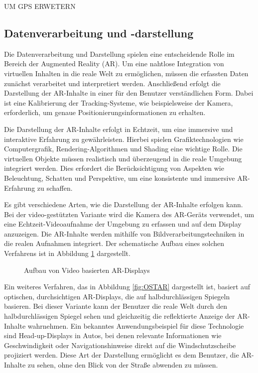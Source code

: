 UM GPS ERWETERN

\subsection{Datenverarbeitung und -darstellung}

Die Datenverarbeitung und Darstellung spielen eine entscheidende Rolle im
Bereich der Augmented Reality (AR). Um eine nahtlose Integration von virtuellen
Inhalten in die reale Welt zu ermöglichen, müssen die erfassten Daten zunächst
verarbeitet und interpretiert werden. Anschließend erfolgt die Darstellung der
AR-Inhalte in einer für den Benutzer verständlichen Form. Dabei ist eine
Kalibrierung der Tracking-Systeme, wie beispielsweise der Kamera, erforderlich,
um genaue Positionierungsinformationen zu erhalten.

Die Darstellung der AR-Inhalte erfolgt in Echtzeit, um eine immersive und
interaktive Erfahrung zu gewährleisten. Hierbei spielen Grafiktechnologien wie
Computergrafik, Rendering-Algorithmen und Shading eine wichtige Rolle. Die
virtuellen Objekte müssen realistisch und überzeugend in die reale Umgebung
integriert werden. Dies erfordert die Berücksichtigung von Aspekten wie
Beleuchtung, Schatten und Perspektive, um eine konsistente und immersive
AR-Erfahrung zu schaffen.

Es gibt verschiedene Arten, wie die Darstellung der AR-Inhalte erfolgen kann.
Bei der video-gestützten Variante wird die Kamera des AR-Geräts verwendet, um
eine Echtzeit-Videoaufnahme der Umgebung zu erfassen und auf dem Display
anzuzeigen. Die AR-Inhalte werden mithilfe von Bildverarbeitungstechniken in
die realen Aufnahmen integriert. Der schematische Aufbau eines solchen
Verfahrens ist in Abbildung \ref{fig:VBAR} dargestellt.

\begin{figure}[h]
      \centering
      
      \caption[width=0.7\columnwidth]{Aufbau von Video basierten AR-Displays \cite{billinghurst2015survey}}
      \label{fig:VBAR}
\end{figure}

Ein weiteres Verfahren, das in Abbildung \ref{fig:OSTAR} dargestellt ist,
basiert auf optischen, durchsichtigen AR-Displays, die auf halbdurchlässigen
Spiegeln basieren. Bei dieser Variante kann der Benutzer die reale Welt durch
den halbdurchlässigen Spiegel sehen und gleichzeitig die reflektierte Anzeige
der AR-Inhalte wahrnehmen. Ein bekanntes Anwendungsbeispiel für diese
Technologie sind Head-up-Displays in Autos, bei denen relevante Informationen
wie Geschwindigkeit oder Navigationshinweise direkt auf die Windschutzscheibe
projiziert werden. Diese Art der Darstellung ermöglicht es dem Benutzer, die
AR-Inhalte zu sehen, ohne den Blick von der Straße abwenden zu müssen.

